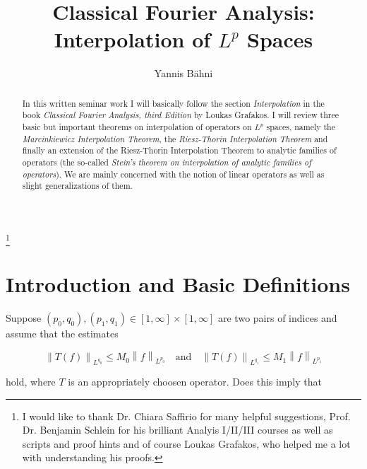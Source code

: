 




\begin{abstract}
	In this written seminar work I will basically follow the section \emph{Interpolation} in the book \emph{Classical Fourier Analysis, third Edition} by Loukas Grafakos. I will review three basic but important theorems on interpolation of operators on $L^p$ spaces, namely the \emph{Marcinkiewicz Interpolation Theorem}, the \emph{Riesz-Thorin Interpolation Theorem} and finally an extension of the Riesz-Thorin Interpolation Theorem to analytic families of operators (the so-called \emph{Stein's theorem on interpolation of analytic families of operators}). We are mainly concerned with the notion of linear operators as well as slight generalizations of them. 
\end{abstract}

\title{Classical Fourier Analysis: Interpolation of $L^p$ Spaces}
\author{Yannis B\"{a}hni}
\address[Yannis B\"{a}hni]{University of Zurich, R\"{a}mistrasse 71, 8006 Zurich}
\thanks{I would like to thank Dr. Chiara Saffirio for many helpful suggestions, Prof. Dr. Benjamin Schlein for his brilliant Analyis I/II/III courses as well as scripts and proof hints and of course Loukas Grafakos, who helped me a lot with understanding his proofs.}
\maketitle

\tableofcontents
\listoffigures

\mainsectionstyle

\section{Introduction and Basic Definitions}
Suppose $\left(p_0,q_0\right),\left( p_1,q_1 \right) \in [1,\infty]\times [1,\infty]$ are two pairs of indices and assume that the estimates 

\begin{equation*}
	\left\|T(f)\right\|_{L^{q_0}} \leq M_0\left\|f\right\|_{L^{p_0}} \quad \text{and} \quad \left\|T(f)\right\|_{L^{q_1}} \leq M_1\left\|f\right\|_{L^{p_1}}
\end{equation*}

\noindent hold, where $T$ is an appropriately choosen operator. Does this imply that

